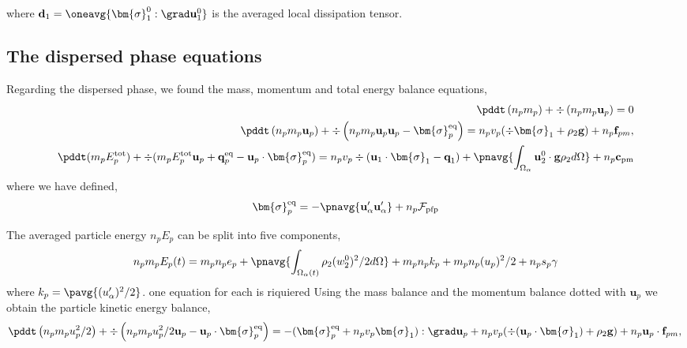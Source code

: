 where $\textbf{d}_1 = \oneavg{\bm{\sigma}_1^0 : \grad \textbf{u}_1^0}$ is the averaged local dissipation tensor. 


\subsection{The dispersed phase equations}

Regarding the dispersed phase, we found the mass, momentum and total energy balance equations, 
\begin{align*}
    \pddt \left(n_p m_p\right)
    + \div \left(n_pm_p\textbf{u}_p
    \right)
    = 
    0\\
    \pddt \left(n_p m_p \textbf{u}_p\right)
    + \div \left(n_p
    m_p \textbf{u}_p \textbf{u}_p 
    - \bm{\sigma}_p^\text{eq}
    \right)
    = 
    n_p v_p  (\div \bm{\sigma}_1 
    + \rho_2 \textbf{g})
    + n_p \textbf{f}_{pm},\\
    \pddt(m_p E_p^\text{tot})
    + \div(m_p E_p^\text{tot} \textbf{u}_p 
    + \textbf{q}_p^\text{eq} - \textbf{u}_p \cdot \bm{\sigma}_p^\text{eq})
    = 
    n_pv_p \div (
        \textbf{u}_1 \cdot \bm{\sigma}_1 - \textbf{q}_1
    )
    + \pnavg{\int_{\Omega_\alpha} \textbf{u}_2^0 \cdot \textbf{g} \rho_2 d\Omega}
    + n_p \textbf{c}_\text{pm}
\end{align*}
where we have defined, 
\begin{align*}
    \bm{\sigma}_p^\text{eq}
    = - \pnavg{\textbf{u}_\alpha'\textbf{u}_\alpha'}
    + n_p \mathcal{F}_\text{pfp}
\end{align*}



The averaged particle energy $n_p E_p$ can be split into five components,
\begin{equation*}
    n_p m_p E_p(t) 
    = m_p n_p e_p 
    + \pnavg{\int_{\Omega_\alpha(t)} \rho_2  (w_2^0)^2/2 d\Omega}
    + m_p n_p k_p
    + m_p n_p (u_p)^2/2
    + n_p s_p \gamma
\end{equation*}
where $k_p = \pavg{(u_\alpha')^2/2}$.
one equation for each is riquiered 
Using the mass balance and the momentum balance dotted with $\textbf{u}_p$ we obtain the particle kinetic energy balance, 
\begin{equation*}
    \pddt \left(n_p m_p u_p^2/ 2\right)
    + \div \left(n_p
    m_p u_p^2/ 2 \textbf{u}_p 
    - \textbf{u}_p \cdot \bm{\sigma}_p^\text{eq}
    \right)
    = 
    - (\bm{\sigma}_p^\text{eq} + n_p v_p \bm{\sigma}_1) :\grad \textbf{u}_p
    +  n_p v_p  (\div (\textbf{u}_p \cdot \bm{\sigma}_1 )
    + \rho_2 \textbf{g})
    + n_p \textbf{u}_p \cdot \textbf{f}_{pm},\\
\end{equation*}

